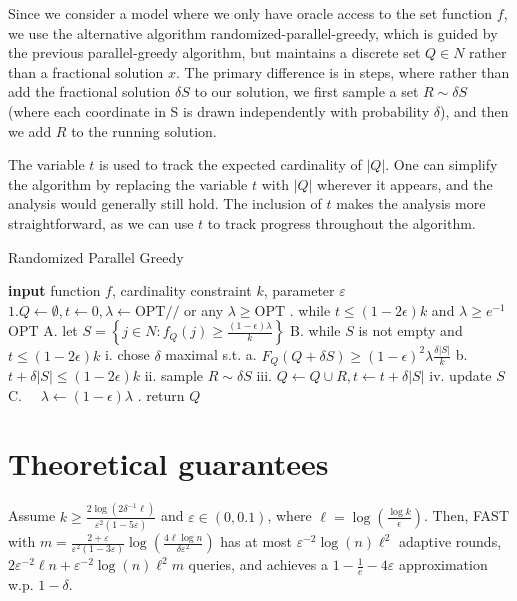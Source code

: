 \documentclass[11pt, a4paper]{article}
\begin{document}
Since we consider a model where we only have oracle access to the set function $f$, we use the alternative algorithm randomized-parallel-greedy, which is guided by the previous parallel-greedy algorithm, but maintains a discrete set $Q \in N$ rather than a fractional solution $x$. The primary difference is in steps, where rather than add the fractional solution $\delta S$ to our solution, we first sample a set $R\sim\delta S$ (where each coordinate in S is drawn independently with probability $\delta$), and then we add $R$ to the running solution.

The variable $t$ is used to track the expected cardinality of $|Q|$. One can simplify the algorithm by replacing the variable $t$ with $|Q|$ wherever it appears, and the analysis would generally still hold. The inclusion of $t$ makes the analysis more straightforward, as we can use $t$ to track progress throughout the algorithm.
\begin{algorithm}[H]
\caption{Randomized Parallel Greedy}
\begin{algorithmic}
    	\STATE \textbf{input} function $f$, cardinality constraint $k$, parameter $\varepsilon$
\STATE$1 . Q \leftarrow \emptyset, t \leftarrow 0, \lambda \leftarrow \mathrm{OPT} / /$ or any $\lambda \geq \mathrm{OPT}$
. while $t \leq(1-2 \epsilon) k$ and $\lambda \geq e^{-1}$ OPT
\STATE \quad A. let $S=\left\{j \in N: f_{Q}(j) \geq \frac{(1-\epsilon) \lambda}{k}\right\}$
\STATE \quad B. while $S$ is not empty and $t \leq(1-2 \epsilon) k$
\STATE \quad \quad i. chose $\delta$ maximal s.t.
\STATE \quad \quad \quad a. $F_{Q}(Q+\delta S) \geq(1-\epsilon)^{2} \lambda \frac{\delta|S|}{k}$
\STATE \quad \quad \quad b. $t+\delta|S| \leq(1-2 \epsilon) k$
\STATE \quad \quad ii. sample $R \sim \delta S$
\STATE \quad \quad iii. $Q \leftarrow Q \cup R, t \leftarrow t+\delta|S|$
\STATE \quad \quad iv. update $S$
\STATE \quad C. $\quad \lambda \leftarrow(1-\epsilon) \lambda$
. return $Q$
  \end{algorithmic}
  \label{alg:full}
\end{algorithm}

\section{Theoretical guarantees}
\begin{theorem}
\label{thm:main_FAST} 
Assume $k \geq \frac{2 \log(2\delta^{-1} \ell)}{\varepsilon^2 (1 - 5\varepsilon)}$ and $\varepsilon \in (0, 0.1)$, where  $\ell = \log(\frac{\log k}{\epsilon})$. Then, \textsc{FAST} with $m = \frac{2 + \varepsilon}{\varepsilon^2(1 -  3\varepsilon)} \log(\frac{4\ell\log n}{\delta \varepsilon^2})$ has at most $\varepsilon^{-2} \log(n)  \ell^2$  adaptive rounds,   
$2\varepsilon^{-2}  \ell n +  \varepsilon^{-2} \log(n) \ell^2 m$ queries, and achieves a $1 - \frac{1}{e} - 4 \varepsilon$ approximation 
w.p. $1 - \delta$.
\end{theorem} 
\end{document}
